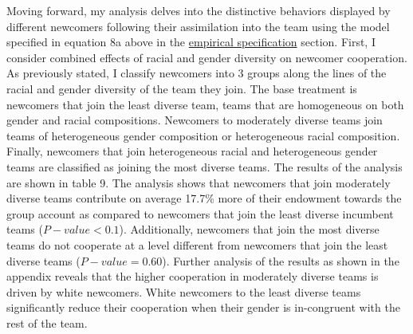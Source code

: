 \hspace  *{0mm} Moving forward, my analysis delves into the distinctive behaviors displayed by different newcomers following their assimilation into the team using the model specified in equation 8a above in the \hyperref[subsec:Specification]{empirical specification} section. First, I consider combined effects of racial and gender diversity on newcomer cooperation. As previously stated, I classify newcomers into 3 groups along the lines of the racial and gender diversity of the team they join. The base treatment is newcomers that join the least diverse team, teams that are homogeneous on both gender and racial compositions. Newcomers to moderately diverse teams join teams of heterogeneous gender composition or heterogeneous racial composition. Finally, newcomers that join heterogeneous racial and heterogeneous gender teams are classified as joining the most diverse teams. The results of the analysis are shown in table 9. The analysis shows that newcomers that join moderately diverse teams contribute on average 17.7\% more of their endowment towards the group account as compared to newcomers that join the least diverse incumbent teams ($P-value<0.1$). Additionally, newcomers that join the most diverse teams do not cooperate at a level different from newcomers that join the least diverse teams ($P-value=0.60$). Further analysis of the results as shown in the appendix reveals that the higher cooperation in moderately diverse teams is driven by white newcomers. White newcomers to the least diverse teams significantly reduce their cooperation when their gender is in-congruent with the rest of the team. 

